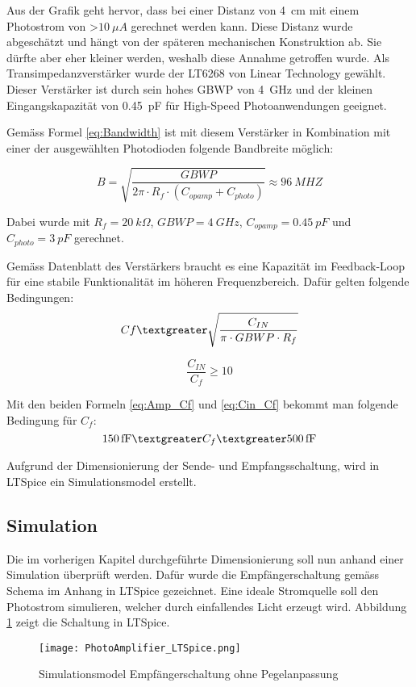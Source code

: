 Aus der Grafik geht hervor, dass bei einer Distanz von \SI{4}{cm} mit einem Photostrom von \textgreater $\SI{10}{\mu A}$ gerechnet werden kann. Diese Distanz wurde abgeschätzt und hängt von der späteren mechanischen Konstruktion ab. Sie dürfte aber eher kleiner werden, weshalb diese Annahme getroffen wurde.
\newline
Als Transimpedanzverstärker wurde der LT6268 von Linear Technology gewählt. Dieser Verstärker ist durch sein hohes GBWP von \SI{4}{GHz} und der kleinen Eingangskapazität von \SI{0.45}{pF} für High-Speed Photoanwendungen geeignet.

Gemäss Formel \ref{eq:Bandwidth} ist mit diesem Verstärker in Kombination mit einer der ausgewählten Photodioden folgende Bandbreite möglich:

\begin{equation}\label{eq:Bandwidth2}
B=\sqrt{\frac{GBWP}{2\pi\cdot R_{f}\cdot (C_{opamp}+C_{photo})}}\approx \SI{96}{MHZ}
\end{equation}

Dabei wurde mit $R_{f}=\SI{20}{k\Omega}$, $GBWP=\SI{4}{GHz}$, $C_{opamp}=\SI{0.45}{pF}$ und $C_{photo}=\SI{3}{pF}$ gerechnet.

Gemäss Datenblatt des Verstärkers braucht es eine Kapazität im Feedback-Loop für eine stabile Funktionalität im höheren Frequenzbereich. Dafür gelten folgende Bedingungen:
\begin{equation}\label{eq:Amp_Cf}
C{f}\textgreater \sqrt{\frac{C_{IN}}{\pi\cdot GBWP\cdot R_{f}}}
\end{equation}

\begin{equation}\label{eq:Cin_Cf}
\frac{C_{IN}}{C_{f}}\geq 10
\end{equation}

Mit den beiden Formeln \ref{eq:Amp_Cf} und \ref{eq:Cin_Cf} bekommt man folgende Bedingung für $C_{f}$: 
\begin{equation}\label{eq:Cfminmax}
\SI{150}{fF}\textgreater C_{f}\textgreater \SI{500}{fF}
\end{equation}

Aufgrund der Dimensionierung der Sende- und Empfangsschaltung, wird in LTSpice ein Simulationsmodel erstellt.

\subsection{Simulation}
Die im vorherigen Kapitel durchgeführte Dimensionierung soll nun anhand einer Simulation überprüft werden.
Dafür wurde die Empfängerschaltung gemäss Schema im Anhang in LTSpice gezeichnet. Eine ideale Stromquelle soll den Photostrom simulieren, welcher durch einfallendes Licht erzeugt wird. Abbildung \ref{fig:Photo_LTSpice} zeigt die Schaltung in LTSpice.
\begin{figure}[h]
	\centering
	\texttt{[image: PhotoAmplifier\_LTSpice.png]}
	\caption{Simulationsmodel Empfängerschaltung ohne Pegelanpassung}\label{fig:Photo_LTSpice}
\end{figure}

